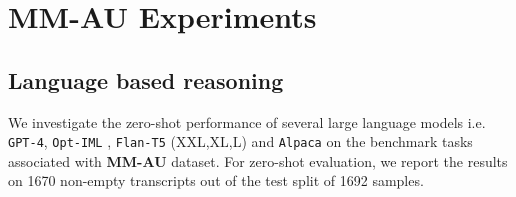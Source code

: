 \section{MM-AU Experiments}
\label{app:language_baselines}
\subsection{Language based reasoning}

We investigate the zero-shot performance of several large language models i.e. \texttt{GPT-4}\cite{OpenAI2023GPT4TR}, \texttt{Opt-IML} \cite{Iyer2022OPTIMLSL}, \texttt{Flan-T5} (XXL,XL,L) \cite{Chung2022ScalingIL} and \texttt{Alpaca} \cite{alpaca} on the benchmark tasks associated with \textbf{MM-AU} dataset. For zero-shot evaluation, we report the results on 1670 non-empty transcripts out of the test split of 1692 samples.
